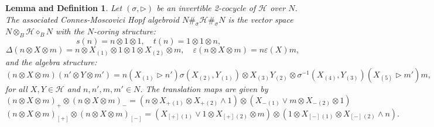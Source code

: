 \documentclass[a4paper,reqno]{amsart}
\numberwithin{equation}{section}
\theoremstyle{plain}
\newtheorem{LD}[thm]{Lemma and Definition}
\theoremstyle{remark}
\numberwithin{equation}{section}
\newcommand{\ot}{\otimes}
\renewcommand{\o}{{}_{\scriptscriptstyle{(1)}}}
\renewcommand{\t}{{}_{\scriptscriptstyle{(2)}}}
\newcommand{\la}{{\triangleright}}
\newcommand{\CH}{\mathcal{H}}
\begin{document}
\begin{LD}
    Let  $(\sigma,\la)$ be  an invertible  2-cocycle of $\CH$ over $N$. The associated \emph{Connes-Moscovici Hopf algebroid} $N\#_{\sigma}\CH\#_{\sigma}N$ is the vector space $N\ot_{B} \CH\diamond_{B} N$ with the $N$-coring structure:
    \[s(n)=n\ot 1\ot 1,\quad t(n)=1\ot 1\ot n,\quad \]
    \[\Delta(n\ot X\ot m)=n\ot X\o\ot 1\ot 1\ot X\t\ot m,\quad \varepsilon(n\ot X\ot m)=n\varepsilon(X)m,\]
and the algebra structure:
    \[(n\ot X\ot m)(n'\ot Y\ot m')=n(X\o\la n')\sigma(X_{\scriptscriptstyle{(2)}}, Y\o)\ot X_{\scriptscriptstyle{(3)}}Y_{\scriptscriptstyle{(2)}}\ot \sigma^{-1}(X_{\scriptscriptstyle{(4)}}, Y_{\scriptscriptstyle{(3)}})(X_{\scriptscriptstyle{(5)}}\la m')m,\]
    for all $X,Y\in \CH$ and $n, n', m, m'\in N$. The translation maps are given by
    \[(n\ot X\ot m)_{+}\ot(n\ot X\ot m)_{-}=(n\ot X_{+}\o\ot X_{+}\t\wedge 1)\ot (X_{-}\o\vee m\ot X_{-}\t\ot 1)\]
    \[(n\ot X\ot m)_{[+]}\ot(n\ot X\ot m)_{[-]}=(X_{[+]}\o\vee 1\ot X_{[+]}\t\ot  m)\ot (1\ot X_{[-]}\o\ot X_{[-]}\t\wedge n).\]
\end{LD}
\end{document}

